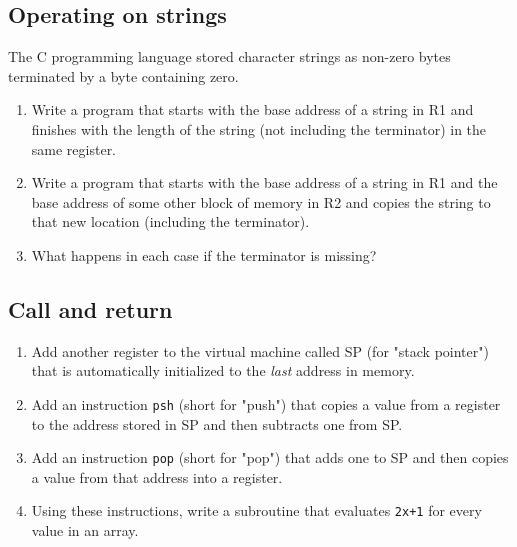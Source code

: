 \documentclass[krantzl]{krantz}
\begin{document}
\subsection*{Operating on strings}


The C programming language stored character strings as non-zero bytes terminated by a byte containing zero.

\begin{enumerate}

\item 

Write a program that starts with the base address of a string in R1
    and finishes with the length of the string (not including the terminator) in the same register.



\item 

Write a program that starts with the base address of a string in R1
    and the base address of some other block of memory in R2
    and copies the string to that new location (including the terminator).



\item 

What happens in each case if the terminator is missing?



\end{enumerate}

\subsection*{Call and return}

\begin{enumerate}

\item 

Add another register to the virtual machine called SP (for "stack pointer")
    that is automatically initialized to the \emph{last} address in memory.



\item 

Add an instruction \texttt{psh} (short for "push") that copies a value from a register
    to the address stored in SP and then subtracts one from SP.



\item 

Add an instruction \texttt{pop} (short for "pop") that adds one to SP
    and then copies a value from that address into a register.



\item 

Using these instructions,
    write a subroutine that evaluates \texttt{2x+1} for every value in an array.



\end{enumerate}
\end{document}
